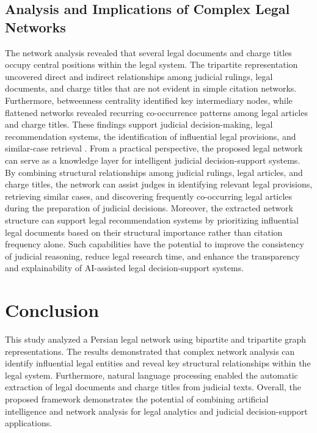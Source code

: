 \documentclass[twoside]{article}
\begin{document}
\subsection{Analysis and Implications of Complex Legal Networks}
The network analysis revealed that several legal documents and charge titles occupy central positions within the legal system. The tripartite representation uncovered direct and indirect relationships among judicial rulings, legal documents, and charge titles that are not evident in simple citation networks. Furthermore, betweenness centrality identified key intermediary nodes, while flattened networks revealed recurring co-occurrence patterns among legal articles and charge titles. These findings support judicial decision-making, legal recommendation systems, the identification of influential legal provisions, and similar-case retrieval \citep{Barron:2025}.
From a practical perspective, the proposed legal network can serve as a knowledge layer for intelligent judicial decision-support systems. By combining structural relationships among judicial rulings, legal articles, and charge titles, the network can assist judges in identifying relevant legal provisions, retrieving similar cases, and discovering frequently co-occurring legal articles during the preparation of judicial decisions. Moreover, the extracted network structure can support legal recommendation systems by prioritizing influential legal documents based on their structural importance rather than citation frequency alone. Such capabilities have the potential to improve the consistency of judicial reasoning, reduce legal research time, and enhance the transparency and explainability of AI-assisted legal decision-support systems.
\vspace{-0.3cm}
\section{	Conclusion}   
This study analyzed a Persian legal network using bipartite and tripartite graph representations. The results demonstrated that complex network analysis can identify influential legal entities and reveal key structural relationships within the legal system. Furthermore, natural language processing enabled the automatic extraction of legal documents and charge titles from judicial texts. Overall, the proposed framework demonstrates the potential of combining artificial intelligence and network analysis for legal analytics and judicial decision-support applications.
\end{document}
